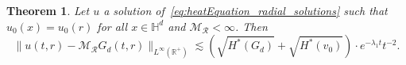 \documentclass[12pt,longbibliography]{article}
\def\R{\mathbb{R}}
\def\R{\mathbb{R}}
\def\H{\mathbb{H}}
\newtheorem{thm}{Theorem}[section]
\theoremstyle{definition}
\theoremstyle{remark}
\theoremstyle{example}
\newcommand{\ag}[1]{{\color{magenta} #1}}
\begin{document}
\begin{thm}\label{thm:radially_symmetric_L^infty asymtotic}
	Let $u$ a solution of~\eqref{eq:heatEquation_radial_solutions} such that $u_0(x)=u_0(r)$ for all $x\in\H^d$ and $\mathcal{M}_{\mathcal{R}}<\infty$. Then
	\[
	\| u(t,r) - \mathcal{M}_{\mathcal{R}}G_d(t,r)  \|_{L^\infty(\R^+)}\lesssim \left(\sqrt{H^*(G_d)}+\sqrt{H^*(v_0)}\right) \cdot e^{-\lambda_1 t}t^{-2}.
	\]
\end{thm}

\end{document}
